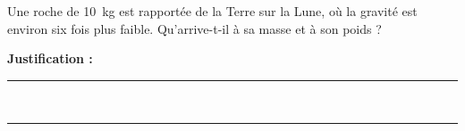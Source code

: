 Une roche de \qty{10}{kg} est rapportée de la Terre sur la Lune, où la gravité est environ six fois plus faible. Qu'arrive-t-il à sa masse et à son poids ?

\choices

\noindent\textbf{Justification :} \hrulefill \\[2.5ex]
\rule{\linewidth}{0.4pt} \\[2.5ex]
\rule{\linewidth}{0.4pt}
\vfill
